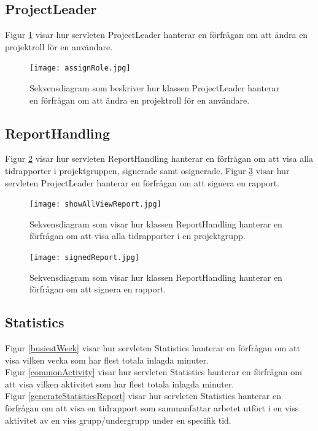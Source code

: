 \documentclass[a4paper]{article}
\begin{document}
\subsection{ProjectLeader}
Figur \ref{assignRole} visar hur servleten ProjectLeader hanterar en förfrågan om att ändra en projektroll för en användare.

\begin{figure}[h!]
\centering
\texttt{[image: assignRole.jpg]}
\caption{Sekvensdiagram som beskriver hur klassen ProjectLeader hanterar en förfrågan om att ändra en projektroll för en användare.
\label{assignRole}}
\end{figure}

\subsection{ReportHandling}

Figur \ref{showAllViewReport} visar hur servleten ReportHandling hanterar en förfrågan om att visa alla tidrapporter i projektgruppen, signerade samt osignerade. Figur \ref{signedReport} visar hur servleten ProjectLeader hanterar en förfrågan om att signera en rapport.

\begin{figure}[h!]
\centering
\texttt{[image: showAllViewReport.jpg]}
\caption{Sekvensdiagram som visar hur klassen ReportHandling hanterar en förfrågan om att visa alla tidrapporter i en projektgrupp.
\label{showAllViewReport}}
\end{figure}

\begin{figure}[h!]
\centering
\texttt{[image: signedReport.jpg]}
\caption{Sekvensdiagram som visar hur klassen ReportHandling hanterar en förfrågan om att signera en rapport.
\label{signedReport}}
\end{figure}

\subsection{Statistics}
Figur \ref{busiestWeek} visar hur servleten Statistics hanterar en förfrågan om att visa vilken vecka som har flest totala inlagda minuter.\\
Figur \ref{commonActivity} visar hur servleten Statistics hanterar en förfrågan om att visa vilken aktivitet som har flest totala inlagda minuter.\\
Figur \ref{generateStatisticsReport} visar hur servleten Statistics hanterar en förfrågan om att visa en tidrapport som sammanfattar arbetet utfört i en viss aktivitet av en viss grupp/undergrupp under en specifik tid.
\end{document}
